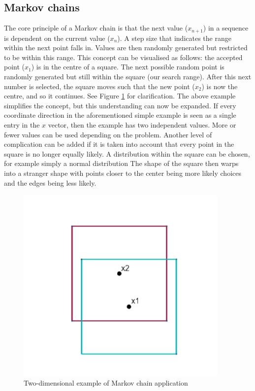	\subsection{Markov chains}	\label{markovexpl}
	The core principle of a Markov chain is that the next value  ($x_{n+1}$) in a sequence is dependent on the current value  ($x_n$). 
	A step size that indicates the range within the next point falls in.
	Values are then randomly generated but restricted to be within this range.
	This concept can be visualised as follows: the accepted point  ($x_1$) is in the centre of a square. The next possible random point is randomly generated but still within the square (our search range). 	
	After this next number is selected, the square moves such that the new point  ($x_2$) is now the centre, and so it continues.
	See Figure \ref{fig:MCsquare} for clarification.
	The above example simplifies the concept, but this understanding can now be expanded.
	If every coordinate direction in the aforementioned simple example is seen as a single entry in the $x$ vector, then the example has two independent values.
	More or fewer values can be used depending on the problem.
	Another level of complication can be added if it is taken into account that every point in the square is no longer equally likely.
	A distribution within the square can be chosen, for example simply a normal distribution
	The shape of the square then warps into a stranger shape with points closer to the center being more likely choices and the edges being less likely.
	

	\begin{figure}	
	\centering
	\includegraphics[width=0.55\linewidth]{figures/MC_squares1.png}
	\caption{Two-dimensional example of Markov chain application}
	\label{fig:MCsquare}
	\end{figure}
	
